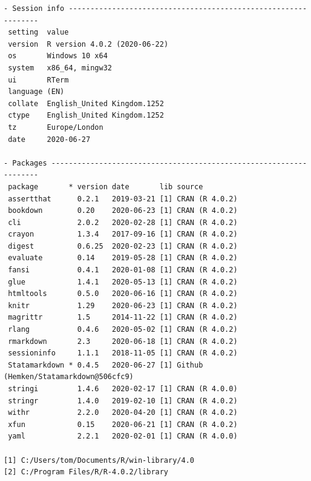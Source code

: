 \documentclass[
  10pt,
]{book}
\begin{document}
\begin{verbatim}
- Session info ---------------------------------------------------------------
 setting  value                       
 version  R version 4.0.2 (2020-06-22)
 os       Windows 10 x64              
 system   x86_64, mingw32             
 ui       RTerm                       
 language (EN)                        
 collate  English_United Kingdom.1252 
 ctype    English_United Kingdom.1252 
 tz       Europe/London               
 date     2020-06-27                  

- Packages -------------------------------------------------------------------
 package       * version date       lib source                               
 assertthat      0.2.1   2019-03-21 [1] CRAN (R 4.0.2)                       
 bookdown        0.20    2020-06-23 [1] CRAN (R 4.0.2)                       
 cli             2.0.2   2020-02-28 [1] CRAN (R 4.0.2)                       
 crayon          1.3.4   2017-09-16 [1] CRAN (R 4.0.2)                       
 digest          0.6.25  2020-02-23 [1] CRAN (R 4.0.2)                       
 evaluate        0.14    2019-05-28 [1] CRAN (R 4.0.2)                       
 fansi           0.4.1   2020-01-08 [1] CRAN (R 4.0.2)                       
 glue            1.4.1   2020-05-13 [1] CRAN (R 4.0.2)                       
 htmltools       0.5.0   2020-06-16 [1] CRAN (R 4.0.2)                       
 knitr           1.29    2020-06-23 [1] CRAN (R 4.0.2)                       
 magrittr        1.5     2014-11-22 [1] CRAN (R 4.0.2)                       
 rlang           0.4.6   2020-05-02 [1] CRAN (R 4.0.2)                       
 rmarkdown       2.3     2020-06-18 [1] CRAN (R 4.0.2)                       
 sessioninfo     1.1.1   2018-11-05 [1] CRAN (R 4.0.2)                       
 Statamarkdown * 0.4.5   2020-06-27 [1] Github (Hemken/Statamarkdown@506cfc9)
 stringi         1.4.6   2020-02-17 [1] CRAN (R 4.0.0)                       
 stringr         1.4.0   2019-02-10 [1] CRAN (R 4.0.2)                       
 withr           2.2.0   2020-04-20 [1] CRAN (R 4.0.2)                       
 xfun            0.15    2020-06-21 [1] CRAN (R 4.0.2)                       
 yaml            2.2.1   2020-02-01 [1] CRAN (R 4.0.0)                       

[1] C:/Users/tom/Documents/R/win-library/4.0
[2] C:/Program Files/R/R-4.0.2/library
\end{verbatim}

  

\backmatter
\end{document}
